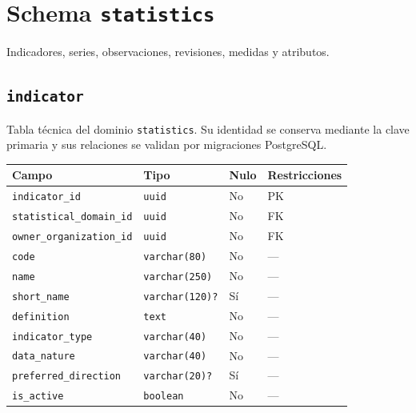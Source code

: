 \documentclass[11pt]{article}
\begin{document}
\section{Schema \texttt{statistics}}
Indicadores, series, observaciones, revisiones, medidas y atributos.
\subsection{\texttt{indicator}}
Tabla técnica del dominio \texttt{statistics}. Su identidad se conserva mediante la clave primaria y sus relaciones se validan por migraciones PostgreSQL.
\begin{longtable}{>{\raggedright\arraybackslash}p{} p{} p{} p{}}
\toprule Campo & Tipo & Nulo & Restricciones \\ \midrule\endhead
\texttt{indicator\_id} & \texttt{uuid} & No & PK \\
\texttt{statistical\_domain\_id} & \texttt{uuid} & No & FK \\
\texttt{owner\_organization\_id} & \texttt{uuid} & No & FK \\
\texttt{code} & \texttt{varchar(80)} & No & --- \\
\texttt{name} & \texttt{varchar(250)} & No & --- \\
\texttt{short\_name} & \texttt{varchar(120)?} & Sí & --- \\
\texttt{definition} & \texttt{text} & No & --- \\
\texttt{indicator\_type} & \texttt{varchar(40)} & No & --- \\
\texttt{data\_nature} & \texttt{varchar(40)} & No & --- \\
\texttt{preferred\_direction} & \texttt{varchar(20)?} & Sí & --- \\
\texttt{is\_active} & \texttt{boolean} & No & --- \\
\bottomrule\end{longtable}
\end{document}
